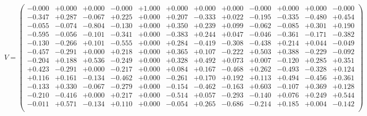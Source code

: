 \documentclass[9pt]{article}
\theoremstyle{plain}
\theoremstyle{definition}
\theoremstyle{remark}
\numberwithin{equation}{section}
\begin{document}
$V = \left(
\begin{array}{
cccccccccccc}
-0.000 & +0.000 & +0.000 & -0.000 & +1.000 & +0.000 & +0.000 & +0.000 & -0.000 & +0.000 & +0.000 & -0.000 \\
-0.347 & +0.287 & -0.067 & +0.225 & +0.000 & +0.207 & -0.333 & +0.022 & -0.195 & -0.335 & -0.480 & +0.454 \\
-0.055 & -0.074 & -0.804 & -0.130 & +0.000 & +0.350 & +0.239 & +0.099 & -0.062 & -0.085 & +0.301 & +0.190 \\
-0.595 & -0.056 & -0.101 & -0.341 & +0.000 & -0.383 & +0.244 & +0.047 & -0.046 & -0.361 & -0.171 & -0.382 \\
-0.130 & -0.266 & +0.101 & -0.555 & +0.000 & +0.284 & -0.419 & -0.308 & -0.438 & +0.214 & +0.044 & -0.049 \\
-0.457 & -0.291 & +0.000 & +0.218 & +0.000 & +0.365 & +0.107 & -0.222 & +0.503 & +0.388 & -0.229 & -0.092 \\
-0.204 & +0.188 & +0.536 & -0.249 & +0.000 & +0.328 & +0.492 & +0.073 & +0.007 & -0.120 & +0.285 & +0.351 \\
+0.423 & -0.291 & +0.000 & -0.217 & +0.000 & +0.084 & +0.167 & -0.468 & +0.262 & -0.493 & -0.328 & +0.124 \\
+0.116 & +0.161 & -0.134 & -0.462 & +0.000 & -0.261 & +0.170 & +0.192 & +0.113 & +0.494 & -0.456 & +0.361 \\
-0.133 & +0.330 & -0.067 & -0.279 & +0.000 & -0.154 & -0.462 & -0.163 & +0.603 & -0.107 & +0.369 & +0.128 \\
-0.210 & -0.416 & +0.000 & +0.217 & +0.000 & -0.514 & +0.057 & -0.293 & -0.140 & +0.076 & +0.249 & +0.544 \\
-0.011 & +0.571 & -0.134 & +0.110 & +0.000 & -0.054 & +0.265 & -0.686 & -0.214 & +0.185 & +0.004 & -0.142 \\
\end{array}
\right)$ \newline 
\end{document}
